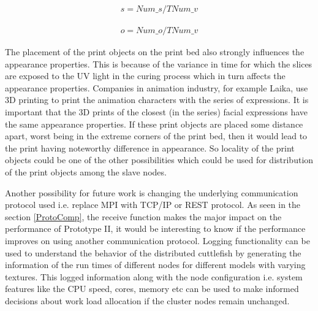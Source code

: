 \begin{equation}
\label{eq:s}
\begin{aligned}
s= Num\_{s} / TNum\_{v}
\end{aligned}
\end{equation}   

\begin{equation}
\label{eq:o}
\begin{aligned}
o=  Num\_{o} / TNum\_{v}
\end{aligned}
\end{equation}   

The placement of the print objects on the print bed also strongly influences the appearance properties. This is because of the variance in time for which the slices are exposed to the UV light in the curing process which in turn affects the appearance properties. Companies in animation industry, for example Laika, use 3D printing to print the animation characters with the series of expressions. It is important that the 3D prints of the closest (in the series) facial expressions have the same appearance properties. If these print objects are placed some distance apart, worst being in the extreme corners of the print bed, then it would lead to the print having noteworthy difference in appearance. So locality of the print objects could be one of the other possibilities which could be used for distribution of the print objects among the slave nodes. \newline 

Another possibility for future work is changing the underlying communication protocol used i.e. replace MPI with TCP/IP or REST protocol. As seen in the section \ref{ProtoComp}, the receive function makes the major impact  on the performance of Prototype II, it would be interesting to know if the performance improves on using another communication protocol. Logging functionality can be used to understand the behavior of the distributed cuttlefish by generating the information of the run times of different nodes for different models with varying textures. This logged information along with the node configuration i.e. system features like the CPU speed, cores, memory etc can be used to make informed decisions about work load allocation if the cluster nodes remain unchanged. \newline

